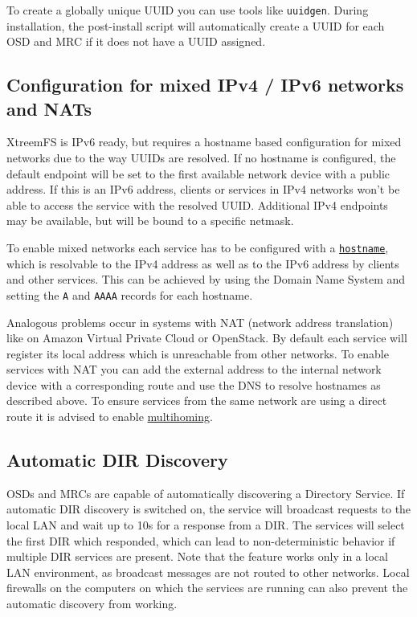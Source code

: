 \documentclass[a4paper,10pt]{book}
\begin{document}
To create a globally unique UUID you can use tools like \texttt{uuidgen}. During installation, the post-install script will automatically create a UUID for each OSD and MRC if it does not have a UUID assigned.


\subsection{Configuration for mixed IPv4 / IPv6 networks and NATs}

XtreemFS is IPv6 ready, but requires a hostname based configuration for mixed networks due to the way UUIDs are resolved. If no hostname is configured, the default endpoint will be set to the first available network device with a public address. If this is an IPv6 address, clients or services in IPv4 networks won't be able to access the service with the resolved UUID. Additional IPv4 endpoints may be available, but will be bound to a specific netmask.

To enable mixed networks each service has to be configured with a \hyperref[options:hostname]{\texttt{hostname}}, which is resolvable to the IPv4 address as well as to the IPv6 address by clients and other services. This can be achieved by using the Domain Name System and setting the \texttt{A} and \texttt{AAAA} records for each hostname.

Analogous problems occur in systems with NAT (network address translation) like on Amazon Virtual Private Cloud or OpenStack. By default each service will register its local address which is unreachable from other networks. To enable services with NAT you can add the external address to the internal network device with a corresponding route and use the DNS to resolve hostnames as described above. To ensure services from the same network are using a direct route it is advised to enable \hyperref[option:multihoming.enabled]{multihoming}.


\subsection{Automatic DIR Discovery}
\label{sec:autodiscover}
OSDs and MRCs are capable of automatically discovering a Directory Service. If automatic DIR discovery is switched on, the service will broadcast requests to the local LAN and wait up to 10s for a response from a DIR. The services will select the first DIR which responded, which can lead to non-deterministic behavior if multiple DIR services are present. Note that the feature works only in a local LAN environment, as broadcast messages are not routed to other networks. Local firewalls on the computers on which the services are running can also prevent the automatic discovery from working.
\end{document}
